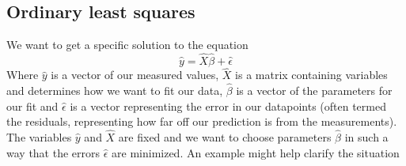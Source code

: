 \newcommand{\colVec}[1]{\begin{bmatrix} #1_0 \\ #1_1 \\ \vdots \\ #1_{n-1} \\ #1_{n} \end{bmatrix}}

\subsection{Ordinary least squares}
We want to get a specific solution to the equation
\begin{equation}\label{eq: linearFit} \hat{y} = \hat{X}\hat{\beta}+\hat{\epsilon} \end{equation}
Where $\hat{y}$ is a vector of our measured values, $\hat{X}$ is a matrix containing variables and determines how we want to fit our data, $\hat{\beta}$ is a vector of the parameters for our fit and $\hat{\epsilon}$ is a vector representing the error in our datapoints (often termed the residuals, representing how far off our prediction is from the measurements). The variables $\hat{y}$ and $\hat{X}$ are fixed and we want to choose parameters $\hat{\beta}$ in such a way that the errors $\hat{\epsilon}$ are minimized. An example might help clarify the situation\\\\

